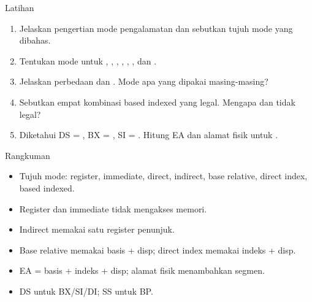\documentclass[aspectratio=169,11pt]{beamer}
\begin{document}
\begin{frame}{Latihan}
\small
\begin{enumerate}
    \item Jelaskan pengertian mode pengalamatan dan sebutkan tujuh
          mode yang dibahas.

    \vspace{0.15em}
    \item Tentukan mode untuk ,
          , ,
          , ,
          , dan .

    \vspace{0.15em}
    \item Jelaskan perbedaan \code{[BX+4]} dan \code{[SI+4]}.
          Mode apa yang dipakai masing-masing?

    \vspace{0.15em}
    \item Sebutkan empat kombinasi based indexed yang legal.
          Mengapa \code{[BX+BP]} dan \code{[SI+DI]} tidak legal?

    \vspace{0.15em}
    \item Diketahui DS = , BX = , SI =
          . Hitung EA dan alamat fisik untuk
          \code{[BX+SI+4]}.
\end{enumerate}
\end{frame}

\begin{frame}{Rangkuman}
\small
\begin{itemize}
    \item Tujuh mode: register, immediate, direct, indirect, base
          relative, direct index, based indexed.

    \vspace{0.15em}
    \item Register dan immediate tidak mengakses memori.

    \vspace{0.15em}
    \item Indirect memakai satu register penunjuk.

    \vspace{0.15em}
    \item Base relative memakai basis + disp; direct index memakai
          indeks + disp.

    \vspace{0.15em}
    \item EA = basis + indeks + disp; alamat fisik menambahkan
          segmen.

    \vspace{0.15em}
    \item DS untuk BX/SI/DI; SS untuk BP.
\end{itemize}
\end{frame}
\end{document}
